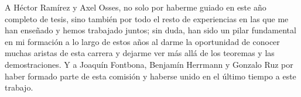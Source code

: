 

A Héctor Ramírez y Axel Osses, no solo por haberme guiado en este año completo de tesis, sino también por todo el resto de experiencias en las que me han enseñado y hemos trabajado juntos; sin duda, han sido un pilar fundamental en mi formación a lo largo de estos años al darme la oportunidad de conocer muchas aristas de esta carrera y dejarme ver más allá de los teoremas y las demostraciones. Y a Joaquín Fontbona, Benjamín Herrmann y Gonzalo Ruz por haber formado parte de esta comisión y haberse unido en el último tiempo a este trabajo.